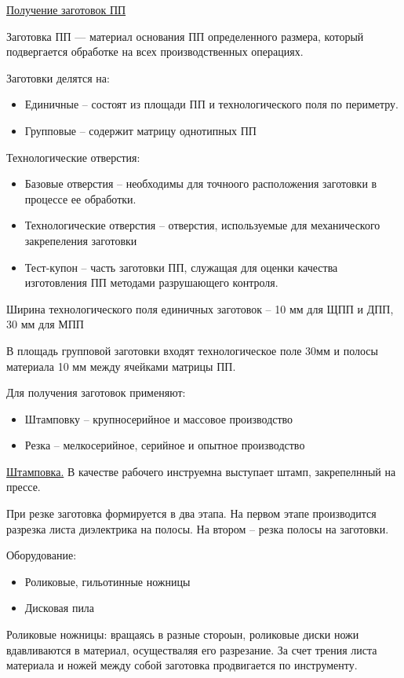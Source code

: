 \documentclass{article}
\begin{document}
\underline{Получение заготовок ПП} 

Заготовка ПП --- материал основания ПП определенного размера, который подвергается обработке на всех производственных операциях.

Заготовки делятся на:
\begin{itemize}
	\item Единичные -- состоят из площади ПП и технологического поля по периметру.
	\item Групповые -- содержит матрицу однотипных ПП
\end{itemize}

Технологические отверстия:
\begin{itemize}
	\item Базовые отверстия -- необходимы для точноого расположения заготовки в процессе ее обработки.
	\item Технологические отверстия -- отверстия, используемые для механического закрепеления заготовки
	\item Тест-купон -- часть заготовки ПП, служащая для оценки качества изготовления ПП методами разрушающего контроля.
\end{itemize}

Ширина технологического поля единичных заготовок -- 10 мм для ЩПП и ДПП, 30 мм для МПП

В площадь групповой заготовки входят технологическое поле 30мм и полосы материала 10 мм между ячейками матрицы ПП.

Для получения заготовок применяют:
\begin{itemize}
	\item Штамповку -- крупносерийное и массовое производство
	\item Резка -- мелкосерийное, серийное и опытное производство
\end{itemize}
\underline{Штамповка.} 
В качестве рабочего инструемна выступает штамп, закрепелнный на прессе.

При резке заготовка формируется в два этапа. На первом этапе производится разрезка листа диэлектрика на полосы. На втором -- резка полосы на заготовки.

Оборудование:
\begin{itemize}
	\item Роликовые, гильотинные ножницы
	\item Дисковая пила
\end{itemize}

Роликовые ножницы: вращаясь в разные стороын, роликовые диски ножи вдавливаются в материал, осуществаляя его разрезание. За счет трения листа материала и ножей между собой заготовка продвигается по инструменту.
\end{document}

